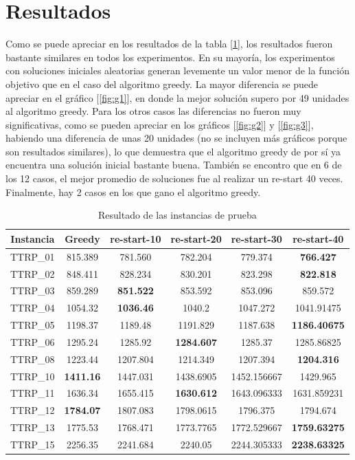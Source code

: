 \documentclass[letter, 10pt]{article}
\begin{document}
\section{Resultados}
Como se puede apreciar en los resultados de la tabla [\ref{table:2}], los resultados fueron bastante similares en todos los experimentos. En su mayoría, los experimentos con soluciones iniciales aleatorias generan levemente un valor menor de la función objetivo que en el caso del algoritmo greedy. La mayor diferencia se puede apreciar en el gráfico [\ref{fig:g1}], en donde la mejor solución supero por 49 unidades al algoritmo greedy. Para los otros casos las diferencias no fueron muy significativas, como se pueden apreciar en los gráficos [\ref{fig:g2}] y [\ref{fig:g3}], habiendo una diferencia de unas 20 unidades (no se incluyen más gráficos porque son resultados similares), lo que demuestra que el algoritmo greedy de por sí ya encuentra una solución inicial bastante buena. También se encontro que en 6 de los 12 casos, el mejor promedio de soluciones fue al realizar un re-start 40 veces. Finalmente, hay 2 casos en los que gano el algoritmo greedy.
\begin{table}[h!]
\begin{center}
\begin{tabular}{ |c|c|c|c|c|c| } 
 \hline
 Instancia & Greedy & re-start-10 &re-start-20& re-start-30 & re-start-40 \\
 \hline
 TTRP\_01 & 815.389 & 781.560 &782.204& 779.374 & \textbf{766.427}\\
 \hline
 TTRP\_02 & 848.411 & 828.234 &830.201& 823.298 & \textbf{822.818} \\
 \hline
 TTRP\_03 & 859.289 & \textbf{851.522} &853.592& 853.096 & 859.572\\
 \hline
 TTRP\_04 & 1054.32 & \textbf{1036.46} &1040.2& 1047.272 & 1041.91475 \\
 \hline
 TTRP\_05 & 1198.37 & 1189.48 &1191.829& 1187.638 & \textbf{1186.40675} \\
 \hline
 TTRP\_06 & 1295.24 & 1285.92 &\textbf{1284.607}& 1285.37 & 1285.86825 \\
 \hline
 TTRP\_08 & 1223.44 & 1207.804 &1214.349& 1207.394 & \textbf{1204.316} \\
 \hline
 TTRP\_10 & \textbf{1411.16} & 1447.031 &1438.6905& 1452.156667 & 1429.965 \\
 \hline
 TTRP\_11 & 1636.34 & 1655.415 &\textbf{1630.612}& 1643.096333 & 1631.859231 \\
 \hline
 TTRP\_12 & \textbf{1784.07} & 1807.083 &1798.0615& 1796.375 & 1794.674 \\
 \hline
 TTRP\_13 & 1775.53 & 1768.471 &1773.7765& 1772.529667 & \textbf{1759.63275}\\
 \hline
 TTRP\_15 & 2256.35 & 2241.684&2240.05 & 2244.305333 & \textbf{2238.63325}  \\
 \hline
\end{tabular}
\caption{Resultado de las instancias de prueba}
\label{table:2}
\end{center}
\end{table}
\end{document}
